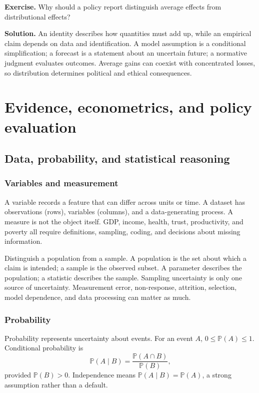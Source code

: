 \documentclass[11pt,oneside,openany]{book}
\newcommand{\Prob}{\mathbb{P}}
\newcommand{\exercise}[1]{\textbf{Exercise.} #1}
\newcommand{\solution}[1]{\textbf{Solution.} #1}
\begin{document}
\exercise{Why should a policy report distinguish average effects from distributional effects?}

\solution{An identity describes how quantities must add up, while an empirical claim depends on data and identification. A model assumption is a conditional simplification; a forecast is a statement about an uncertain future; a normative judgment evaluates outcomes. Average gains can coexist with concentrated losses, so distribution determines political and ethical consequences.}

\part{Evidence, econometrics, and policy evaluation}

\chapter{Data, probability, and statistical reasoning}
\label{ch:data}

\section{Variables and measurement}

A variable records a feature that can differ across units or time. A dataset has observations (rows), variables (columns), and a data-generating process. A measure is not the object itself. GDP, income, health, trust, productivity, and poverty all require definitions, sampling, coding, and decisions about missing information.

Distinguish a population from a sample. A population is the set about which a claim is intended; a sample is the observed subset. A parameter describes the population; a statistic describes the sample. Sampling uncertainty is only one source of uncertainty. Measurement error, non-response, attrition, selection, model dependence, and data processing can matter as much.

\section{Probability}

Probability represents uncertainty about events. For an event $A$, $0\leq\Prob(A)\leq1$. Conditional probability is
\[
  \Prob(A\mid B)=\frac{\Prob(A\cap B)}{\Prob(B)},
\]
provided $\Prob(B)>0$. Independence means $\Prob(A\mid B)=\Prob(A)$, a strong assumption rather than a default.
\end{document}
